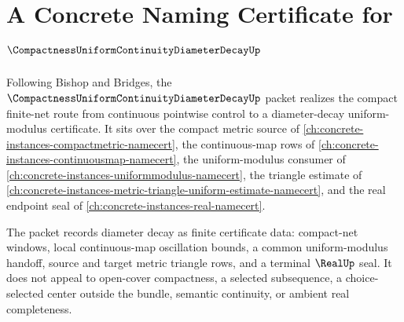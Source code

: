 \chapter{A Concrete Naming Certificate for $\CompactnessUniformContinuityDiameterDecayUp$}
\label{ch:concrete-instances-compactness-uniform-continuity-diameter-decay-namecert}

Following Bishop and Bridges, the $\CompactnessUniformContinuityDiameterDecayUp$ packet realizes the compact finite-net route from continuous pointwise control to a diameter-decay uniform-modulus certificate. It sits over the compact metric source of \autoref{ch:concrete-instances-compactmetric-namecert}, the continuous-map rows of \autoref{ch:concrete-instances-continuousmap-namecert}, the uniform-modulus consumer of \autoref{ch:concrete-instances-uniformmodulus-namecert}, the triangle estimate of \autoref{ch:concrete-instances-metric-triangle-uniform-estimate-namecert}, and the real endpoint seal of \autoref{ch:concrete-instances-real-namecert}.

The packet records diameter decay as finite certificate data: compact-net windows, local continuous-map oscillation bounds, a common uniform-modulus handoff, source and target metric triangle rows, and a terminal $\RealUp$ seal. It does not appeal to open-cover compactness, a selected subsequence, a choice-selected center outside the bundle, semantic continuity, or ambient real completeness.

